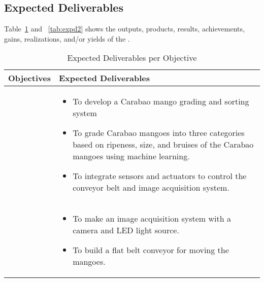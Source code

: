 

\subsection{Expected Deliverables}

Table~\ref{tab:expd1} and ~\ref{tab:expd2} shows the outputs, 
products, results, achievements, gains, realizations, and/or
yields of the \documentType. 

\begin{table}[!htbp]
	\caption{Expected Deliverables per Objective} 	
	\label{tab:expd1} 
	{\centering \scriptsize
		\begin{tabular}{p{}|p{}}
			\hline 
			\hline 
			\textbf{Objectives} & 
			\textbf{Expected Deliverables}\\ 
			\hline 
			\Paste{GO} &
			\begin{minipage}{0.55\textwidth}
				\vspace{10pt} 
				\begin{itemize}
					\item To develop a Carabao mango grading and sorting system 
					\item To grade Carabao mangoes into three categories based on ripeness, size, and 
					bruises of the Carabao mangoes using machine learning.
					\item To integrate sensors and actuators to control the conveyor belt and image acquisition system.
				\end{itemize}
			\end{minipage} \\ \hline

			\Paste{SO1} & 
			\begin{minipage}{0.55\textwidth}
				\vspace{10pt}
				\begin{itemize}
					\item To make an image acquisition system with a camera and LED light source.
					\item To build a flat belt conveyor for moving the mangoes.
				\end{itemize}
			\end{minipage} \\ \hline


\end{tabular}}
\end{table}
